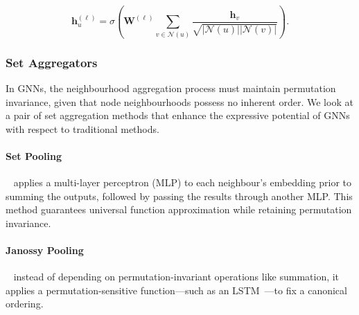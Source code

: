 \begin{equation*}
    \mathbf{h}_u^{(\ell)} = \sigma\left(\mathbf{W}^{(\ell)}\sum_{v \in \mathcal{N}(u)}\frac{ \mathbf{h}_v}{\sqrt{|\mathcal{N}(u)||\mathcal{N}(v)|}}\right).
\end{equation*}

\subsubsection{Set Aggregators}
In GNNs, the neighbourhood aggregation process must maintain permutation invariance, given that node neighbourhoods possess no inherent order. We look at a pair of set aggregation methods that enhance the expressive potential of GNNs with respect to traditional methods. 

\paragraph{Set Pooling}~\cite{zaheer2017deepSets} applies a multi-layer perceptron (MLP) to each neighbour’s embedding prior to summing the outputs, followed by passing the results through another MLP. This method guarantees universal function approximation while retaining permutation invariance. 

\paragraph{Janossy Pooling}~\cite{murphy2018janossyPooling} instead of depending on permutation-invariant operations like summation, it applies a permutation-sensitive function—such as an LSTM~\cite{hochreiter1997LSTM}—to fix a canonical ordering.

